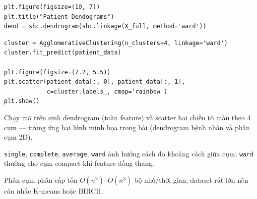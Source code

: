 \begin{vidu}[title={Dendrogram trên toàn bộ feature}]
\begin{lstlisting}
plt.figure(figsize=(10, 7))
plt.title("Patient Dendograms")
dend = shc.dendrogram(shc.linkage(X_full, method='ward'))
\end{lstlisting}
\end{vidu}

\begin{vidu}[title={Phân 4 cụm trên hai chiều đã chọn}]
\begin{lstlisting}
cluster = AgglomerativeClustering(n_clusters=4, linkage='ward')
cluster.fit_predict(patient_data)

plt.figure(figsize=(7.2, 5.5))
plt.scatter(patient_data[:, 0], patient_data[:, 1],
            c=cluster.labels_, cmap='rainbow')
plt.show()
\end{lstlisting}
\end{vidu}

\begin{ynghia}[title={Hai đồ thị đầu ra}]
Chạy mã trên sinh dendrogram (toàn feature) và scatter hai chiều tô màu theo 4 cụm --- tương ứng hai hình minh họa trong bài (dendrogram bệnh nhân và phân cụm 2D).
\end{ynghia}

\begin{tinhchat}[title={Linkage}]
\texttt{single}, \texttt{complete}, \texttt{average}, \texttt{ward} ảnh hưởng cách đo khoảng cách giữa cụm; \texttt{ward} thường cho cụm compact khi feature đồng thang.
\end{tinhchat}

\begin{luuy}[title={Chi phí}]
Phân cụm phân cấp tốn $O(n^2)$--$O(n^3)$ bộ nhớ/thời gian; dataset rất lớn nên cân nhắc K-means hoặc BIRCH.
\end{luuy}
